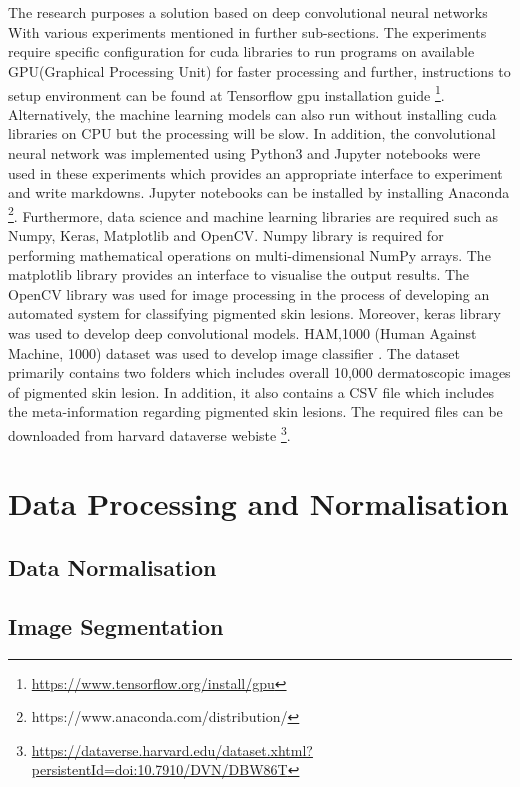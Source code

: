 \section*{}
The research purposes a solution based on deep convolutional neural networks
With various experiments mentioned in further sub-sections.  The experiments
require specific configuration for cuda libraries to run programs on available GPU(Graphical Processing Unit) for faster processing
and further, instructions to setup environment can be found at Tensorflow gpu installation guide \footnote[1]{\url{https://www.tensorflow.org/install/gpu}}.
Alternatively, the machine learning models can also run without installing cuda libraries on CPU but the processing will be slow.
In addition, the convolutional neural network was implemented using Python3 and Jupyter notebooks were used in these experiments which provides an appropriate interface to experiment and write markdowns.  
Jupyter notebooks can be installed by installing Anaconda \footnote[2]{https://www.anaconda.com/distribution/}.
Furthermore, data science and machine learning libraries are required such as Numpy, Keras, Matplotlib and OpenCV. 
Numpy library is required for performing mathematical operations on multi-dimensional NumPy arrays. The matplotlib library provides an interface to visualise the output results. 
The OpenCV library was used for image processing in the process of developing an automated system for classifying
pigmented skin lesions. Moreover, keras library was used to develop deep convolutional models. 
HAM,1000 (Human Against Machine, 1000) dataset was used to develop image classifier \citep{DVN/DBW86T_2018}.
The dataset primarily contains two folders which includes overall 10,000 dermatoscopic images of pigmented skin lesion. In addition, it also contains a CSV file which includes the meta-information regarding pigmented skin lesions.
The required files can be downloaded from harvard dataverse webiste \footnote[3]{\url{https://dataverse.harvard.edu/dataset.xhtml?persistentId=doi:10.7910/DVN/DBW86T}}.

\pagebreak
\section{Data Processing and Normalisation}

\subsection{Data Normalisation}

\subsection{ Image Segmentation }

\pagebreak
